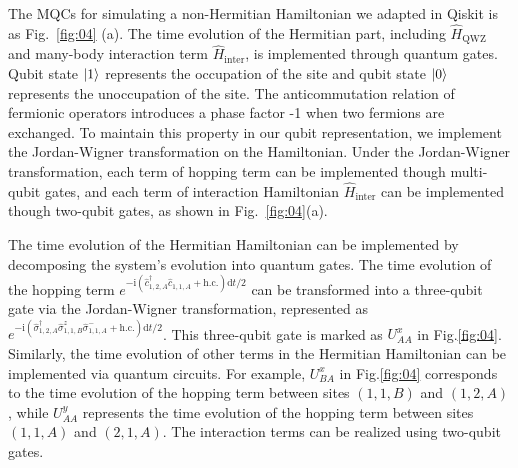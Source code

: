 \documentclass[longbibliography, aps, prx, amsmath, amssymb, amsfonts, twocolumn,superscriptaddress, footinbib]{revtex4-1}
\begin{document}
	The MQCs for simulating a non-Hermitian Hamiltonian we adapted in Qiskit is as Fig.~\ref{fig:04} (a). The time evolution of the Hermitian part, including $\hat{H}_{\text{QWZ}}$ and many-body interaction term $\hat{H}_{\text{inter}}$, is implemented through quantum gates. 
	Qubit state $\ket{1}$ represents the occupation of the site and qubit state $\ket{0}$ represents the unoccupation of the site. 
	The anticommutation relation of fermionic operators introduces a phase factor -1 when two fermions are exchanged. To maintain this property in our qubit representation, we implement the Jordan-Wigner transformation on the Hamiltonian.
	Under the Jordan-Wigner transformation, each term of hopping term can be implemented though multi-qubit gates, and each term of interaction Hamiltonian $\hat{H}_{\text{inter}}$ can be implemented though two-qubit gates, as shown in Fig.~\ref{fig:04}(a). 

	The time evolution of the Hermitian Hamiltonian can be implemented by decomposing the system's evolution into quantum gates. The time evolution of the hopping term $e^{-\mathrm{i} (\hat{c}_{1,2,A}^{\dagger} \hat{c}_{1,1,A} + \text{h.c.})\mathrm{d} t/2}$ can be transformed into a three-qubit gate via the Jordan-Wigner transformation, represented as $e^{-\mathrm{i} (\hat{\sigma}_{1,2,A}^{\dagger} \hat{\sigma}^z_{1,1,B}\hat{\sigma}_{1,1,A}^{-} + \text{h.c.})\mathrm{d} t/2}$. This three-qubit gate is marked as $U_{AA}^x$ in Fig.\ref{fig:04}. Similarly, the time evolution of other terms in the Hermitian Hamiltonian can be implemented via quantum circuits. For example, $U_{BA}^x$ in Fig.\ref{fig:04} corresponds to the time evolution of the hopping term between sites $(1,1,B)$ and $(1,2,A)$, while $U_{AA}^y$ represents the time evolution of the hopping term between sites $(1,1,A)$ and $(2,1,A)$. The interaction terms can be realized using two-qubit gates.
\end{document}
